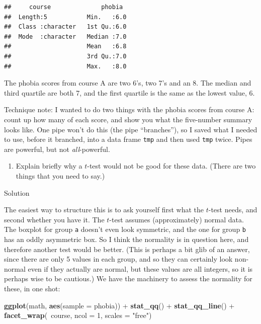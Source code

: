 \documentclass[]{tufte-book}
\newenvironment{Shaded}{}{}
\newcommand{\DataTypeTok}[1]{\textcolor[rgb]{0.56,0.13,0.00}{#1}}
\newcommand{\DecValTok}[1]{\textcolor[rgb]{0.25,0.63,0.44}{#1}}
\newcommand{\KeywordTok}[1]{\textcolor[rgb]{0.00,0.44,0.13}{\textbf{#1}}}
\newcommand{\NormalTok}[1]{#1}
\newcommand{\OperatorTok}[1]{\textcolor[rgb]{0.40,0.40,0.40}{#1}}
\newcommand{\StringTok}[1]{\textcolor[rgb]{0.25,0.44,0.63}{#1}}
\providecommand{\tightlist}{%
  \setlength{\itemsep}{0pt}\setlength{\parskip}{0pt}}
\theoremstyle{definition}
\theoremstyle{definition}
\theoremstyle{definition}
\theoremstyle{remark}
\begin{document}
\begin{verbatim}
##     course              phobia   
##  Length:5           Min.   :6.0  
##  Class :character   1st Qu.:6.0  
##  Mode  :character   Median :7.0  
##                     Mean   :6.8  
##                     3rd Qu.:7.0  
##                     Max.   :8.0
\end{verbatim}

The phobia scores from course A are two 6's, two 7's and an 8. The
median and third quartile are both 7, and the first quartile is the same
as the lowest value, 6.

Technique note: I wanted to do two things with the phobia scores from
course A: count up how many of each score, and show you what the
five-number summary looks like. One pipe won't do this (the pipe
``branches''), so I saved what I needed to use, before it branched, into
a data frame \texttt{tmp} and then used \texttt{tmp} twice. Pipes are
powerful, but not \emph{all}-powerful.

\begin{enumerate}
\def\labelenumi{(\alph{enumi})}
\setcounter{enumi}{3}
\tightlist
\item
  Explain briefly why a \(t\)-test would not be good for these data.
  (There are two things that you need to say.)
\end{enumerate}

Solution

The easiest way to structure this is to ask yourself first what the
\(t\)-test needs, and second whether you have it. The \(t\)-test assumes
(approximately) normal data. The boxplot for group \texttt{a} doesn't
even look symmetric, and the one for group \texttt{b} has an oddly
asymmetric box. So I think the normality is in question here, and
therefore another test would be better. (This is perhaps a bit glib of
an answer, since there are only 5 values in each group, and so they can
certainly look non-normal even if they actually are normal, but these
values are all integers, so it is perhaps wise to be cautious.) We have
the machinery to assess the normality for these, in one shot:

\begin{Shaded}
\begin{Highlighting}[]
\KeywordTok{ggplot}\NormalTok{(math, }\KeywordTok{aes}\NormalTok{(}\DataTypeTok{sample =}\NormalTok{ phobia)) }\OperatorTok{+}\StringTok{ }\KeywordTok{stat_qq}\NormalTok{() }\OperatorTok{+}\StringTok{ }
\StringTok{    }\KeywordTok{stat_qq_line}\NormalTok{() }\OperatorTok{+}\StringTok{ }\KeywordTok{facet_wrap}\NormalTok{(}\OperatorTok{~}\NormalTok{course, }\DataTypeTok{ncol =} \DecValTok{1}\NormalTok{, }
    \DataTypeTok{scales =} \StringTok{"free"}\NormalTok{)}
\end{Highlighting}
\end{Shaded}
\end{document}
